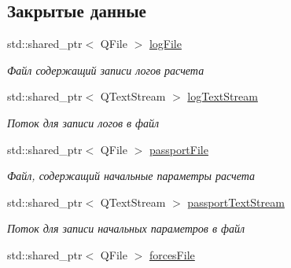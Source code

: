 \subsection*{Закрытые данные}
\begin{DoxyCompactItemize}
\item 
\mbox{\label{class_logger_a7f8bc1fc02fd13c37d3755c3d4bd7ad8}} 
std\+::shared\+\_\+ptr$<$ Q\+File $>$ \mbox{\hyperlink{class_logger_a7f8bc1fc02fd13c37d3755c3d4bd7ad8}{log\+File}}
\begin{DoxyCompactList}\small\item\em Файл содержащий записи логов расчета \end{DoxyCompactList}\item 
\mbox{\label{class_logger_af734bf0624e35d186013fa6db0fcc54a}} 
std\+::shared\+\_\+ptr$<$ Q\+Text\+Stream $>$ \mbox{\hyperlink{class_logger_af734bf0624e35d186013fa6db0fcc54a}{log\+Text\+Stream}}
\begin{DoxyCompactList}\small\item\em Поток для записи логов в файл \end{DoxyCompactList}\item 
\mbox{\label{class_logger_af5f51b937b1a9ada9f0f42ce7d783606}} 
std\+::shared\+\_\+ptr$<$ Q\+File $>$ \mbox{\hyperlink{class_logger_af5f51b937b1a9ada9f0f42ce7d783606}{passport\+File}}
\begin{DoxyCompactList}\small\item\em Файл, содержащий начальные параметры расчета \end{DoxyCompactList}\item 
\mbox{\label{class_logger_a05f85c8316ecf752f7a2091f41ca8a06}} 
std\+::shared\+\_\+ptr$<$ Q\+Text\+Stream $>$ \mbox{\hyperlink{class_logger_a05f85c8316ecf752f7a2091f41ca8a06}{passport\+Text\+Stream}}
\begin{DoxyCompactList}\small\item\em Поток для записи начальных параметров в файл \end{DoxyCompactList}\item 
\mbox{\label{class_logger_aeddfa63047a76d38893add754e4475ce}} 
std\+::shared\+\_\+ptr$<$ Q\+File $>$ \mbox{\hyperlink{class_logger_aeddfa63047a76d38893add754e4475ce}{forces\+File}}

\end{DoxyCompactItemize}
